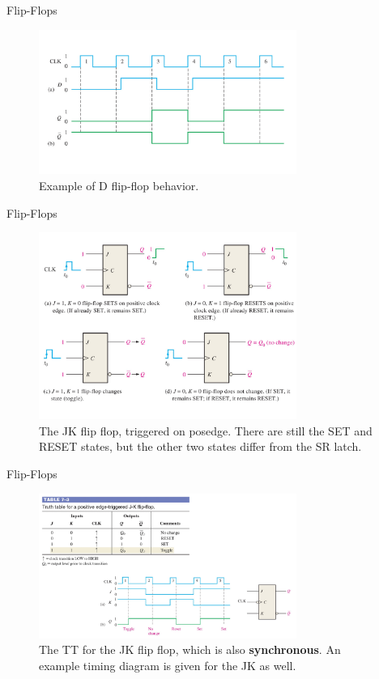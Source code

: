 \documentclass{beamer}
\begin{document}
\begin{frame}{Flip-Flops}
\begin{figure}
\centering
\includegraphics[width=0.75\textwidth]{figures/edge3.pdf}
\caption{\label{fig:ff3} Example of D flip-flop behavior.}
\end{figure}
\end{frame}

\begin{frame}{Flip-Flops}
\begin{figure}
\centering
\includegraphics[width=0.75\textwidth]{figures/edge4.pdf}
\caption{\label{fig:ff4} The JK flip flop, triggered on posedge.  There are still the SET and RESET states, but the other two states differ from the SR latch.}
\end{figure}
\end{frame}

\begin{frame}{Flip-Flops}
\begin{figure}
\centering
\includegraphics[width=0.75\textwidth]{figures/edge5.pdf}
\caption{\label{fig:ff5} The TT for the JK flip flop, which is also \textbf{synchronous}.  An example timing diagram is given for the JK as well.}
\end{figure}
\end{frame}
\end{document}
